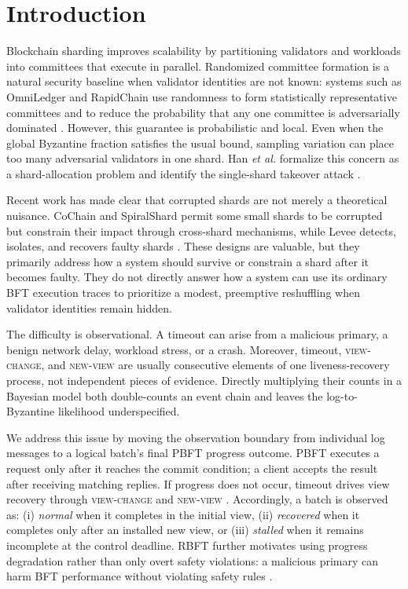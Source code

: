 \documentclass[10pt,conference]{IEEEtran}
\begin{document}
\section{Introduction}

Blockchain sharding improves scalability by partitioning validators and workloads into committees that execute in parallel. Randomized committee formation is a natural security baseline when validator identities are not known: systems such as OmniLedger and RapidChain use randomness to form statistically representative committees and to reduce the probability that any one committee is adversarially dominated \cite{omniledger,rapidchain}. However, this guarantee is probabilistic and local. Even when the global Byzantine fraction satisfies the usual bound, sampling variation can place too many adversarial validators in one shard. Han \emph{et al.} formalize this concern as a shard-allocation problem and identify the single-shard takeover attack \cite{han2022allocation}.

Recent work has made clear that corrupted shards are not merely a theoretical nuisance. CoChain and SpiralShard permit some small shards to be corrupted but constrain their impact through cross-shard mechanisms, while Levee detects, isolates, and recovers faulty shards \cite{cochain,spiralshard,levee}. These designs are valuable, but they primarily address how a system should survive or constrain a shard after it becomes faulty. They do not directly answer how a system can use its ordinary BFT execution traces to prioritize a modest, preemptive reshuffling when validator identities remain hidden.

The difficulty is observational. A timeout can arise from a malicious primary, a benign network delay, workload stress, or a crash. Moreover, timeout, \textsc{view-change}, and \textsc{new-view} are usually consecutive elements of one liveness-recovery process, not independent pieces of evidence. Directly multiplying their counts in a Bayesian model both double-counts an event chain and leaves the log-to-Byzantine likelihood underspecified.

We address this issue by moving the observation boundary from individual log messages to a logical batch's final PBFT progress outcome. PBFT executes a request only after it reaches the commit condition; a client accepts the result after receiving matching replies. If progress does not occur, timeout drives view recovery through \textsc{view-change} and \textsc{new-view} \cite{castro1999pbft}. Accordingly, a batch is observed as: (i) \emph{normal} when it completes in the initial view, (ii) \emph{recovered} when it completes only after an installed new view, or (iii) \emph{stalled} when it remains incomplete at the control deadline. RBFT further motivates using progress degradation rather than only overt safety violations: a malicious primary can harm BFT performance without violating safety rules \cite{aublin2013rbft}.
\end{document}
